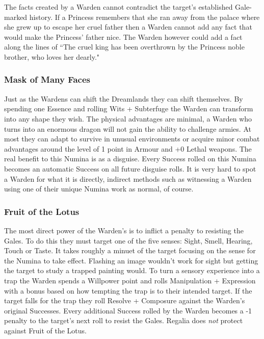 The facts created by a Warden cannot contradict the target's established Gale-marked history. If a Princess remembers that she ran away from the palace where she grew up to escape her cruel father then a Warden cannot add any fact that would make the Princess' father nice. The Warden however could add a fact along the lines of \textquotedblleft The cruel king has been overthrown by the Princess noble brother, who loves her dearly."

\subsubsection*{Mask of Many Faces}

Just as the Wardens can shift the Dreamlands they can shift themselves. By spending one Essence and rolling Wits + Subterfuge the Warden can transform into any shape they wish. The physical advantages are minimal, a Warden who turns into an enormous dragon will not gain the ability to challenge armies. At most they can adapt to survive in unusual environments or acquire minor combat advantages around the level of 1 point in Armour and +0 Lethal weapons. The real benefit to this Numina is as a disguise. Every Success rolled on this Numina becomes an automatic Success on all future disguise rolls. It is very hard to spot a Warden for what it is directly, indirect methods such as witnessing a Warden using one of their unique Numina work as normal, of course.

\subsubsection*{Fruit of the Lotus}

The most direct power of the Warden's is to inflict a penalty to resisting the Gales. To do this they must target one of the five senses: Sight, Smell, Hearing, Touch or Taste. It takes roughly a minuet of the target focusing on the sense for the Numina to take effect. Flashing an image wouldn't work for sight but getting the target to study a trapped painting would. To turn a sensory experience into a trap the Warden spends a Willpower point and rolls Manipulation + Expression with a bonus based on how tempting the trap is to their intended target. If the target falls for the trap they roll Resolve + Composure against the Warden's original Successes. Every additional Success rolled by the Warden becomes a -1 penalty to the target's next roll to resist the Gales. Regalia does \textit{not} protect against Fruit of the Lotus. 

